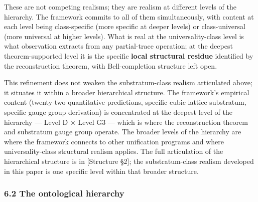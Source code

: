 \documentclass[
]{article}
\begin{document}
These are not competing realisms; they are realism at different levels
of the hierarchy. The framework commits to all of them simultaneously,
with content at each level being class-specific (more specific at deeper
levels) or class-universal (more universal at higher levels). What is
real at the universality-class level is what observation extracts from
any partial-trace operation; at the deepest theorem-supported level it
is the specific \textbf{local structural residue} identified by the
reconstruction theorem, with Bell-completion structure left open.

This refinement does not weaken the substratum-class realism articulated
above; it situates it within a broader hierarchical structure. The
framework's empirical content (twenty-two quantitative predictions,
specific cubic-lattice substratum, specific gauge group derivation) is
concentrated at the deepest level of the hierarchy --- Level D × Level
G3 --- which is where the reconstruction theorem and substratum gauge
group operate. The broader levels of the hierarchy are where the
framework connects to other unification programs and where
universality-class structural realism applies. The full articulation of
the hierarchical structure is in {[}Structure §2{]}; the
substratum-class realism developed in this paper is one specific level
within that broader structure.

\hypertarget{the-ontological-hierarchy}{%
\subsubsection{6.2 The ontological
hierarchy}\label{the-ontological-hierarchy}}
\end{document}
